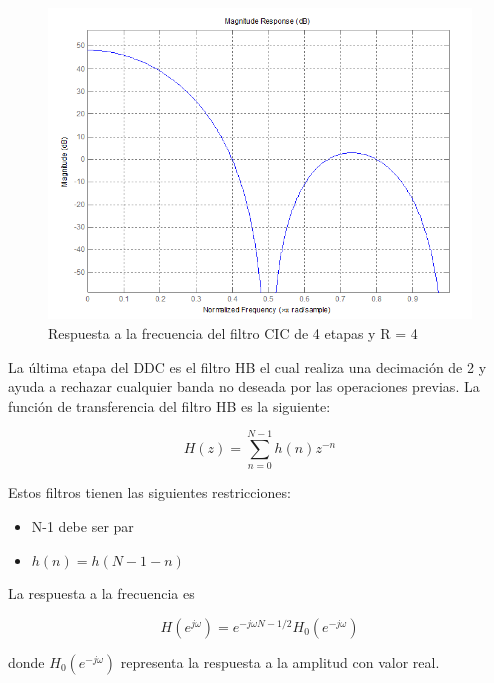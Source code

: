 \begin{figure}[hpt]
\centering
	\includegraphics[width=5.5in]{figs/cicresponse}
	\caption{Respuesta a la frecuencia del filtro CIC de 4 etapas y R =	4}
	\label{fig:cicresp}
\end{figure}

La \'ultima etapa del DDC es el filtro HB el cual realiza una decimaci\'on de 2
y ayuda a rechazar cualquier banda no deseada por las operaciones previas. La
funci\'on de transferencia del filtro HB \cite{nguyen} es la
siguiente:

\begin{equation}
H(z)=\sum_{n=0}^{N-1}h(n)z^{-n}
\end{equation}

Estos filtros tienen las siguientes restricciones:

\begin{itemize}
  \item N-1 debe ser par
  \item $h(n)=h(N-1-n)$
\end{itemize}

La respuesta a la frecuencia es

\begin{equation}
H(e^{j\omega})=e^{-j\omega N-1/2}H_0(e^{-j\omega})
\end{equation}

donde $H_0(e^{-j\omega})$ representa la respuesta a la amplitud con valor real.

